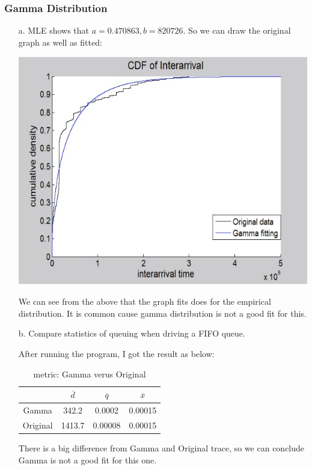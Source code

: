 \documentclass[11pt]{article}
\begin{document}
\subsubsection{Gamma Distribution}
\begin{enumerate}
\item[a.] 
MLE shows that $a=0.470863, b =820726$. So we can draw the original graph as well as fitted:
\begin{center}
\includegraphics[scale=0.5]{write_gamma_cdf.png}
\end{center}
We can see from the above that the graph fits does for the empirical distribution. It is common cause gamma distribution is not a good fit for this.

\item[b.] 
Compare statistics of queuing when driving a FIFO queue.

After running the program, I got the result as below:
\begin{table}[htdp]
\caption{metric: Gamma verus Original}
\begin{center}
\begin{tabular}{c|c|c|c}
	& $\overline{d}$ & $\overline{q}$ & $\overline{x}$ \\
\hline
Gamma & 342.2 & 0.0002 & 0.00015 \\
\hline
Original &1413.7 & 0.00008 & 0.00015
\end{tabular}
\end{center}
\label{default}
\end{table}%
There is a big difference from Gamma and Original trace, so we can conclude Gamma is not a good fit for this one.
\end{enumerate}
\end{document}
